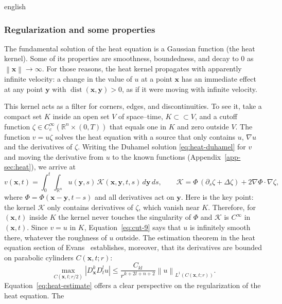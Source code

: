 \documentclass[12pt,letterpaper,twoside]{book}
\newcommand{\norm}[1]{\left\lVert #1 \right\rVert}
\newcommand{\abs}[1]{\left\lvert #1 \right\rvert}
\begin{document}
\begin{hyphenrules}{english}
\subsubsection{Regularization and some properties}
The fundamental solution of the heat equation is a Gaussian function (the heat kernel). Some of its
properties are smoothness, boundedness, and decay to $0$ as $\norm{\mathbf{x}}\to\infty$. For those reasons,
the heat kernel propagates with apparently infinite velocity: a change in the value of $u$ at a point
$\mathbf{x}$ has an immediate effect at any point $\mathbf{y}$ with $\operatorname{dist}(\mathbf{x},\mathbf{y})>0$, as if it were
moving with infinite velocity.

This kernel acts as a filter for corners, edges, and discontinuities. To see it, take a compact set $K$
inside an open set $V$ of space--time, $K\subset\subset V$, and a cutoff function
$\zeta\in C_c^\infty(\mathbb{R}^n\times(0,T))$ that equals one in $K$ and zero outside $V$. The function
$v=u\zeta$ solves the heat equation with a source that only contains $u$, $\nabla u$ and the derivatives
of $\zeta$. Writing the Duhamel solution \eqref{eq:heat-duhamel} for $v$ and moving the derivative from $u$
to the known functions (Appendix~\ref{app-sec:heat}), we arrive at
\begin{equation}
  v(\mathbf{x},t)=\int_0^t\!\!\int_{\mathbb{R}^n}u(\mathbf{y},s)\,\mathcal{K}(\mathbf{x},\mathbf{y},t,s)\,d\mathbf{y}\,d s,
  \qquad\mathcal{K}=\Phi\,(\partial_s\zeta+\Delta\zeta)+2\nabla\Phi\cdot\nabla\zeta,
  \label{eq:cut-9}
\end{equation}
where $\Phi=\Phi(\mathbf{x}-\mathbf{y},t-s)$ and all derivatives act on $\mathbf{y}$. Here is the key point: the kernel $\mathcal{K}$ only contains derivatives of $\zeta$, which vanish
near $K$. Therefore, for $(\mathbf{x},t)$ inside $K$ the kernel never touches the singularity of $\Phi$ and
$\mathcal{K}$ is $C^\infty$ in $(\mathbf{x},t)$. Since $v=u$ in $K$, Equation~\eqref{eq:cut-9} says that $u$ is
infinitely smooth there, whatever the roughness of $u$ outside. The estimation theorem in the heat
equation section of Evans~\cite{evans2010} establishes, moreover, that its derivatives are bounded on
parabolic cylinders $C(\mathbf{x},t;r)$:
\begin{equation}
  \max_{C(\mathbf{x},t;r/2)}\abs{D_{\mathbf{x}}^{k}D_t^{l}u}\le\frac{C_{kl}}{r^{k+2l+n+2}}\norm{u}_{L^1(C(\mathbf{x},t;r))}.
  \label{eq:heat-estimate}
\end{equation}
Equation~\eqref{eq:heat-estimate} offers a clear perspective on the regularization of the heat equation. The

\end{hyphenrules}
\end{document}
